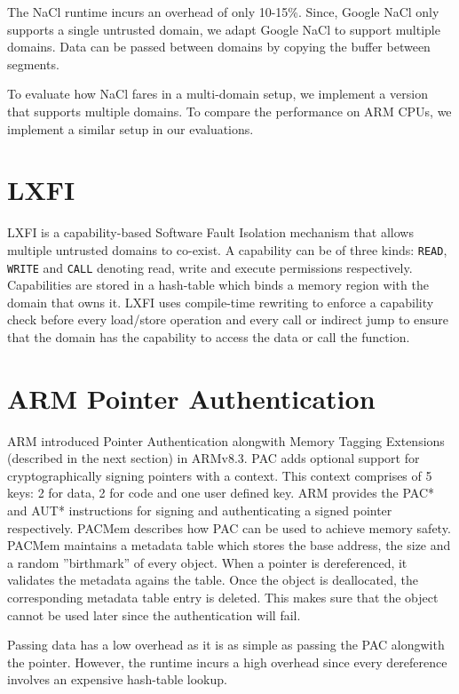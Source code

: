 The NaCl runtime incurs an overhead of only 10-15\%. Since, Google NaCl only supports a single untrusted domain, we adapt Google NaCl to support multiple domains. Data can be passed between domains by copying the buffer between segments. 

To evaluate how NaCl fares in a multi-domain setup, we implement a version that supports multiple domains. To compare the performance on ARM CPUs, we implement a similar setup in our evaluations.

\section{LXFI}
LXFI is a capability-based Software Fault Isolation mechanism that allows multiple untrusted domains to co-exist. A capability can be of three kinds: \lstinline{READ}, \lstinline{WRITE} and \lstinline{CALL} denoting read, write and execute permissions respectively. Capabilities are stored in a hash-table which binds a memory region with the domain that owns it. LXFI uses compile-time rewriting to enforce a capability check before every load/store operation and every call or indirect jump to ensure that the domain has the capability to access the data or call the function. 

\section{ARM Pointer Authentication}
ARM introduced Pointer Authentication alongwith Memory Tagging Extensions (described in the next section) in ARMv8.3. PAC adds optional support for cryptographically signing pointers with a context. This context comprises of 5 keys: 2 for data, 2 for code and one user defined key. ARM provides the PAC* and AUT* instructions for signing and authenticating a signed pointer respectively. PACMem \cite{PACMem} describes how PAC can be used to achieve memory safety. PACMem maintains a metadata table which stores the base address, the size and a random ”birthmark” of every object. When a pointer is dereferenced, it validates the metadata agains the table. Once the object is deallocated, the corresponding metadata table entry is deleted. This makes sure that the object cannot be used later since the authentication will fail.

Passing data has a low overhead as it is as simple as passing the PAC alongwith the pointer. However, the runtime incurs a high overhead since every dereference involves an expensive hash-table lookup.

